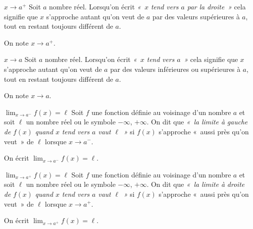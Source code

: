 \documentclass[a4paper,12pt]{article}
\begin{document}
\begin{definition}
$x\rightarrow a^+$
	\tcblower
	Soit $a$ nombre réel.
	Lorsqu'on écrit \emph{«~$x$ tend vers $a$ par la droite~»} cela signifie que $x$ s'approche autant qu'on veut de $a$ par des valeurs supérieures à $a$, tout en restant toujours différent de $a$. 

	On note $x\rightarrow a^+$.
\end{definition}
\begin{definition}
 $x\rightarrow a$
	\tcblower
	Soit $a$ nombre réel.
	Lorsqu'on écrit \emph{«~$x$ tend vers $a$~»} cela signifie que $x$ s'approche autant qu'on veut de $a$ par des valeurs inférieures ou supérieures à $a$, tout en restant toujours différent de $a$.

\noindent	On note $x\rightarrow a$.
\end{definition}
\begin{definition}
$\displaystyle{\lim_{x\rightarrow a^-}f(x)=\ell}$
	\tcblower
Soit $f$ une fonction définie au voisinage d'un nombre $a$ et soit $\ell$ un nombre réel ou le symbole $-\infty$, $+\infty$. On dit que \emph{«~la limite à gauche de $f(x)$ quand $x$ tend vers $a$ vaut $\ell$~»} si $f(x)$ s'approche «~aussi près qu'on veut~» de $\ell$ lorsque $x\rightarrow a^-$.

On écrit $\displaystyle{\lim_{x\rightarrow a^-}f(x)=\ell}$. 
\end{definition}
\begin{definition}
$\displaystyle{\lim_{x\rightarrow a^+}f(x)=\ell}$
	\tcblower
Soit $f$ une fonction définie au voisinage d'un nombre $a$ et soit $\ell$ un nombre réel ou le symbole $-\infty$, $+\infty$. On dit que \emph{«~la limite à droite de $f(x)$ quand $x$ tend vers $a$ vaut $\ell$~»} si $f(x)$ s'approche «~aussi près qu'on veut~» de $\ell$ lorsque $x\rightarrow a^+$.

On écrit $\displaystyle{\lim_{x\rightarrow a^+}f(x)=\ell}$. 
\end{definition}
\end{document}
